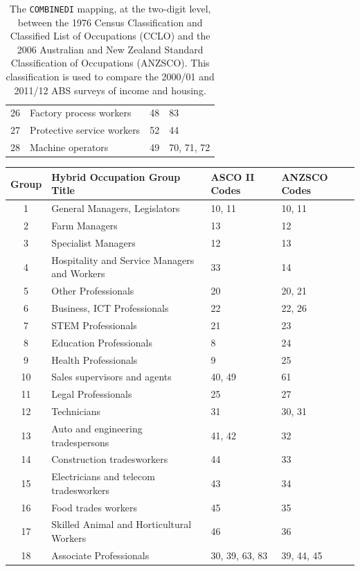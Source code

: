 \begin{table}
\begin{tabular}{clll}
  26 & Factory process workers & 48 & 83 \\ 
  27 & Protective service workers & 52 & 44 \\ 
  28 & Machine operators & 49 & 70, 71, 72 \\ 
   \hline
\end{tabular}
\caption{The {\tt COMBINEDI} mapping, at the two-digit level, between the 1976 Census Classification and Classified List of Occupations (CCLO) and the 2006 Australian and New Zealand Standard Classification of Occupations (ANZSCO). This classification is used to compare the 2000/01 and 2011/12 ABS surveys of income and housing.}
\label{tab:combined1}
\end{table}

\begin{table}
\centering
\begin{tabular}{clll}
  \hline
{\bf Group} & {\bf Hybrid Occupation Group Title} & {\bf ASCO II Codes} & {\bf ANZSCO Codes} \\ 
  \hline
  1 & General Managers, Legislators & 10, 11 & 10, 11 \\ 
  2 & Farm Managers & 13 & 12 \\ 
  3 & Specialist Managers & 12 & 13 \\ 
  4 & Hospitality and Service Managers and Workers & 33 & 14 \\ 
  5 & Other Professionals & 20 & 20, 21 \\ 
  6 & Business, ICT Professionals & 22 & 22, 26 \\ 
  7 & STEM Professionals & 21 & 23 \\ 
  8 & Education Professionals & 8 & 24 \\ 
  9 & Health Professionals & 9 & 25 \\ 
  10 & Sales supervisors and agents & 40, 49 & 61 \\ 
  11 & Legal Professionals & 25 & 27 \\ 
  12 & Technicians & 31 & 30, 31 \\ 
  13 & Auto and engineering tradespersons & 41, 42 & 32 \\ 
  14 & Construction tradesworkers & 44 & 33 \\ 
  15 & Electricians and telecom tradesworkers & 43 & 34 \\ 
  16 & Food trades workers & 45 & 35 \\ 
  17 & Skilled Animal and Horticultural Workers & 46 & 36 \\ 
  18 & Associate Professionals & 30, 39, 63, 83 & 39, 44, 45 \\ 

\end{tabular}
\end{table}
